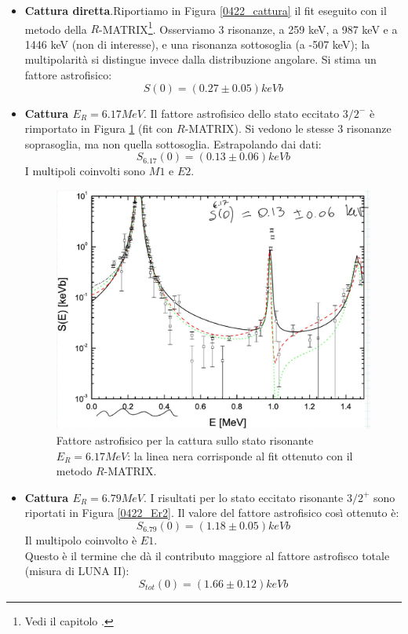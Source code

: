 \begin{itemize}
	\item \textbf{Cattura diretta}.Riportiamo in Figura \ref{0422_cattura} il fit eseguito con il metodo della $R$-MATRIX\footnote{Vedi il capitolo .}. Osserviamo 3 risonanze, a 259 keV, a 987 keV e a 1446 keV (non di interesse), e una risonanza sottosoglia (a -507 keV); la multipolarità si distingue invece dalla distribuzione angolare. Si stima un fattore astrofisico: $$S(0)= (0.27\pm0.05) \unit{keV b}$$
	\item \textbf{Cattura $E_R=6.17\unit{MeV}$}. Il fattore astrofisico dello stato eccitato $3/2^-$ è rimportato in Figura \ref{0422_Er1} (fit con $R$-MATRIX). Si vedono le stesse 3 risonanze soprasoglia, ma non quella sottosoglia. Estrapolando dai dati: $$S_{6.17}(0)= (0.13\pm0.06) \unit{keV b}$$ I multipoli coinvolti sono $M1$ e $E2$. %
	\begin{figure}[!h]
		\centering
		\includegraphics[scale=0.5]{Immagini/0422_0-Se-1.png}
		\caption{Fattore astrofisico per la cattura sullo stato risonante $E_R=6.17\unit{MeV}$: la linea nera corrisponde al fit ottenuto con il metodo $R$-MATRIX.}
		\label{0422_Er1}
	\end{figure}	
	\item \textbf{Cattura $E_R=6.79\unit{MeV}$}. I risultati per lo stato eccitato risonante $3/2^+$ sono riportati in Figura \ref{0422_Er2}. Il valore del fattore astrofisico così ottenuto è: $$S_{6.79}(0) = (1.18\pm 0.05)\unit{keV b}$$ Il multipolo coinvolto è $E1$.\\ Questo è il termine che dà il contributo maggiore al fattore astrofisco totale (misura di LUNA II): $$S_{tot}(0) = (1.66\pm 0.12)\unit{keV b}$$%

\end{itemize}
